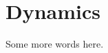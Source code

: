 \documentclass[../dissertation.tex]{\subfiles}
\begin{document}
\chapter{Dynamics}
Some more words here.
\end{document}
